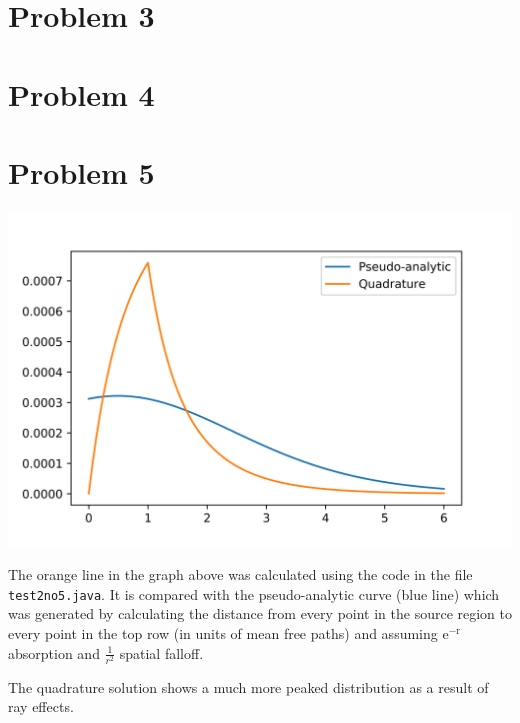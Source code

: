 \documentclass{article}
\begin{document}
\section{Problem 3}

	

\section{Problem 4}

\section{Problem 5}

\includegraphics[width=\textwidth]{no5result}

The orange line in the graph above was calculated using the code in the file \texttt{test2no5.java}. It 
is compared with the pseudo-analytic curve (blue line) which was generated by calculating the 
distance from every point in the source region to every point in the top row (in units of mean free 
paths) and assuming $\mathrm{e^{-r}}$ absorption and $\frac{1}{r^2}$ spatial falloff.

The quadrature solution shows a much more peaked distribution as a result of ray effects.
\end{document}
